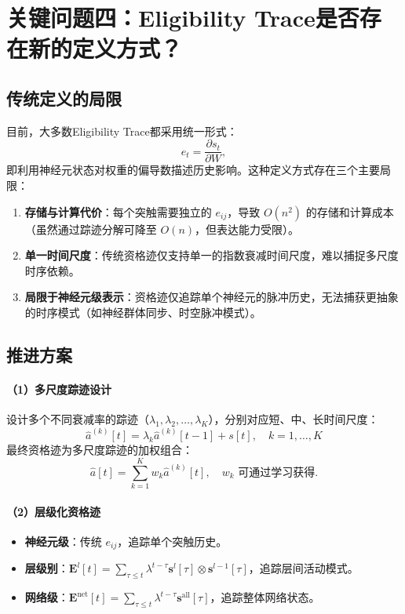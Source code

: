 \documentclass[journal,12pt,onecolumn]{IEEEtran}
\begin{document}
\section{关键问题四：Eligibility Trace是否存在新的定义方式？}

\subsection{传统定义的局限}

目前，大多数Eligibility Trace都采用统一形式：
\[
e_t = \frac{\partial s_t}{\partial W},
\]
即利用神经元状态对权重的偏导数描述历史影响。这种定义方式存在三个主要局限：

\begin{enumerate}
    \item \textbf{存储与计算代价}：每个突触需要独立的 \(e_{ij}\)，导致 \(O(n^2)\) 的存储和计算成本（虽然通过踪迹分解可降至 \(O(n)\)，但表达能力受限）。
    \item \textbf{单一时间尺度}：传统资格迹仅支持单一的指数衰减时间尺度，难以捕捉多尺度时序依赖。
    \item \textbf{局限于神经元级表示}：资格迹仅追踪单个神经元的脉冲历史，无法捕获更抽象的时序模式（如神经群体同步、时空脉冲模式）。
\end{enumerate}

\subsection{推进方案}

\paragraph{（1）多尺度踪迹设计}
设计多个不同衰减率的踪迹（\(\lambda_1, \lambda_2, \dots, \lambda_K\)），分别对应短、中、长时间尺度：
\[
\hat{a}^{(k)}[t] = \lambda_k \hat{a}^{(k)}[t-1] + s[t], \quad k=1,\dots,K
\]
最终资格迹为多尺度踪迹的加权组合：
\[
\hat{a}[t] = \sum_{k=1}^{K} w_k \hat{a}^{(k)}[t], \quad w_k \text{ 可通过学习获得}.
\]

\paragraph{（2）层级化资格迹}
\begin{itemize}
    \item \textbf{神经元级}：传统 \(e_{ij}\)，追踪单个突触历史。
    \item \textbf{层级别}：\(\mathbf{E}^l[t] = \sum_{\tau \le t} \lambda^{t-\tau} \mathbf{s}^l[\tau] \otimes \mathbf{s}^{l-1}[\tau]\)，追踪层间活动模式。
    \item \textbf{网络级}：\(\mathbf{E}^{\text{net}}[t] = \sum_{\tau \le t} \lambda^{t-\tau} \mathbf{s}^{\text{all}}[\tau]\)，追踪整体网络状态。
\end{itemize}
\end{document}
